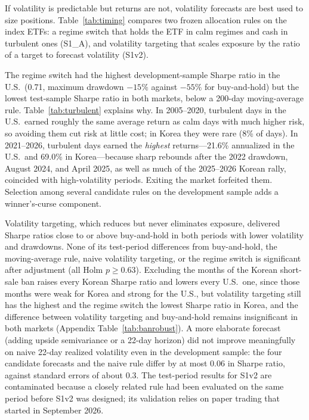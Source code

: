 \documentclass[11pt]{article}
\begin{document}
If volatility is predictable but returns are not, volatility forecasts are best used to size positions. Table~\ref{tab:timing} compares two frozen allocation rules on the index ETFs: a regime switch that holds the ETF in calm regimes and cash in turbulent ones (S1\_A), and volatility targeting that scales exposure by the ratio of a target to forecast volatility (S1v2).

The regime switch had the highest development-sample Sharpe ratio in the U.S.\ (0.71, maximum drawdown $-15\%$ against $-55\%$ for buy-and-hold) but the lowest test-sample Sharpe ratio in both markets, below a 200-day moving-average rule. Table~\ref{tab:turbulent} explains why. In 2005--2020, turbulent days in the U.S.\ earned roughly the same average return as calm days with much higher risk, so avoiding them cut risk at little cost; in Korea they were rare (8\% of days). In 2021--2026, turbulent days earned the \emph{highest} returns---21.6\% annualized in the U.S.\ and 69.0\% in Korea---because sharp rebounds after the 2022 drawdown, August 2024, and April 2025, as well as much of the 2025--2026 Korean rally, coincided with high-volatility periods. Exiting the market forfeited them. Selection among several candidate rules on the development sample adds a winner's-curse component.

Volatility targeting, which reduces but never eliminates exposure, delivered Sharpe ratios close to or above buy-and-hold in both periods with lower volatility and drawdowns. None of its test-period differences from buy-and-hold, the moving-average rule, naive volatility targeting, or the regime switch is significant after adjustment (all Holm $p\ge0.63$). Excluding the months of the Korean short-sale ban raises every Korean Sharpe ratio and lowers every U.S.\ one, since those months were weak for Korea and strong for the U.S., but volatility targeting still has the highest and the regime switch the lowest Sharpe ratio in Korea, and the difference between volatility targeting and buy-and-hold remains insignificant in both markets (Appendix Table~\ref{tab:banrobust}). A more elaborate forecast (adding upside semivariance or a 22-day horizon) did not improve meaningfully on naive 22-day realized volatility even in the development sample: the four candidate forecasts and the naive rule differ by at most 0.06 in Sharpe ratio, against standard errors of about 0.3. The test-period results for S1v2 are contaminated because a closely related rule had been evaluated on the same period before S1v2 was designed; its validation relies on paper trading that started in September 2026.
\end{document}
